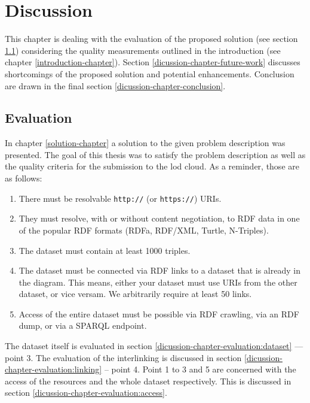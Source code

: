 \documentclass[draft,final]{vutinfth} %
\begin{document}
\chapter{Discussion}
\label{discussion-chapter}

This chapter is dealing with the evaluation of the proposed solution (see section \ref{dicussion-chapter-evaluation}) considering the quality measurements outlined in the introduction (see chapter \ref{introduction-chapter}). Section \ref{dicussion-chapter-future-work} discusses shortcomings of the proposed solution and potential enhancements. Conclusion are drawn in the final section \ref{dicussion-chapter-conclusion}.

\section{Evaluation}
\label{dicussion-chapter-evaluation}
In chapter \ref{solution-chapter} a solution to the given problem description was presented. The goal of this thesis was to satisfy the problem description as well as the quality criteria for the submission to the \gls{lod} cloud. As a reminder, those are as follows\cite{cyganiak_linking_2011}:

\begin{enumerate}
	\item There must be resolvable \texttt{http://} (or \texttt{https://}) URIs.
	\item They must resolve, with or without content negotiation, to RDF data in one of the popular RDF formats (RDFa, RDF/XML, Turtle, N-Triples).
	\item The dataset must contain at least 1000 triples.
	\item The dataset must be connected via RDF links to a dataset that is already in the diagram. This means, either your dataset must use URIs from the other dataset, or vice versam. We arbitrarily require at least 50 links.
	\item Access of the entire dataset must be possible via RDF crawling, via an RDF dump, or via a SPARQL endpoint.
\end{enumerate}

The dataset itself is evaluated in section \ref{dicussion-chapter-evaluation:dataset} --- point 3. The evaluation of the interlinking is discussed in section \ref{dicussion-chapter-evaluation:linking} -- point 4.  Point 1 to 3 and 5 are concerned with the access of the resources and the whole dataset respectively. This is discussed in section \ref{dicussion-chapter-evaluation:access}.
\end{document}

